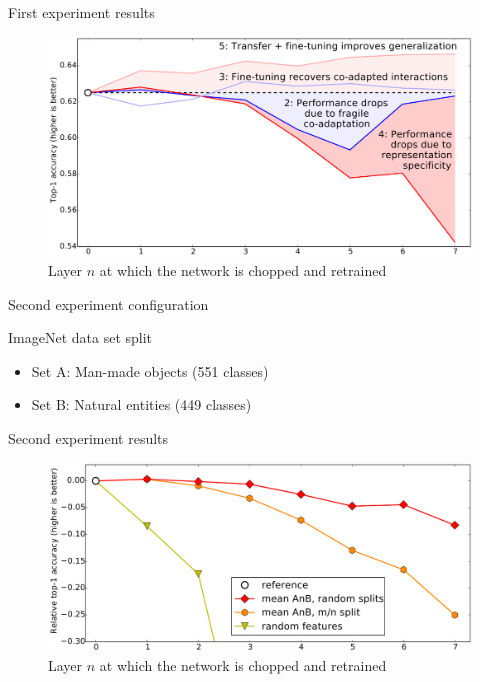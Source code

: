 \documentclass[xcolor=pdftex,dvipsnames,table,mathserif]{beamer}
\begin{document}
\begin{frame}{First experiment results}

  \begin{figure}[ht]
    \centering
    \includegraphics[width=\textwidth]{transfer_learning_res_2}\\
    \scriptsize{Layer $n$ at which the network is chopped and retrained}
  \end{figure}


\end{frame}

\begin{frame}{Second experiment configuration}

  \begin{block}{ImageNet data set split}
    \begin{itemize}
    \item Set A: Man-made objects (551 classes)
    \item Set B: Natural entities (449 classes)
    \end{itemize}
  \end{block}

\end{frame}


\begin{frame}{Second experiment results}

  \begin{figure}[ht]
    \centering
    \includegraphics[width=\textwidth]{transfer_learning_res_3}
    \scriptsize{Layer $n$ at which the network is chopped and retrained}
  \end{figure}

\end{frame}
\end{document}
